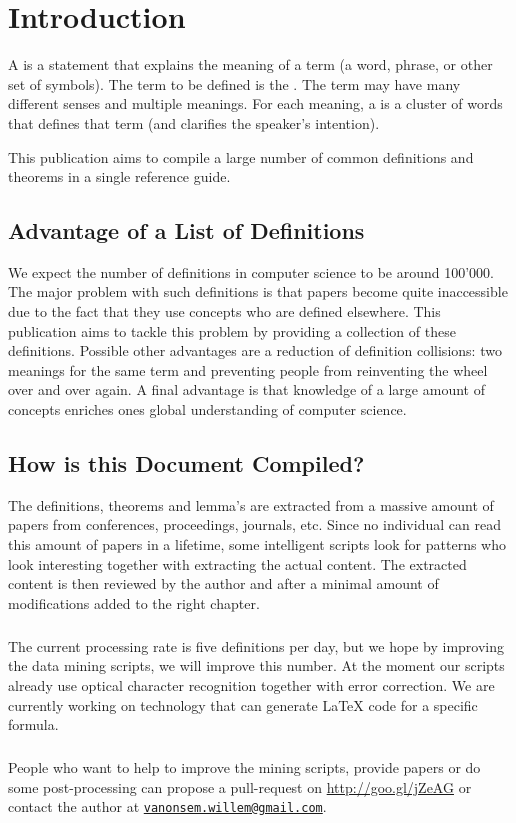 \chapter*{Introduction}

\begin{defi}
A  is a statement that explains the meaning of a term (a word, phrase, or other set of symbols). The term to be defined is the . The term may have many different senses and multiple meanings. For each meaning, a  is a cluster of words that defines that term (and clarifies the speaker's intention).
\cite{wiki:definition}
\end{defi}

This publication aims to compile a large number of common definitions and theorems in a single reference guide.

\section*{Advantage of a List of Definitions}

We expect the number of definitions in computer science to be around 100'000. The major problem with such definitions is that papers become quite inaccessible due to the fact that they use concepts who are defined elsewhere. This publication aims to tackle this problem by providing a collection of these definitions. Possible other advantages are a reduction of definition collisions: two meanings for the same term and preventing people from reinventing the wheel over and over again. A final advantage is that knowledge of a large amount of concepts enriches ones global understanding of computer science.

\section*{How is this Document Compiled?}

The definitions, theorems and lemma's are extracted from a massive amount of papers from conferences, proceedings, journals, etc. Since no individual can read this amount of papers in a lifetime, some intelligent scripts look for patterns who look interesting together with extracting the actual content. The extracted content is then reviewed by the author and after a minimal amount of modifications added to the right chapter.
\paragraph{}
The current processing rate is five definitions per day, but we hope by improving the data mining scripts, we will improve this number. At the moment our scripts already use optical character recognition together with error correction. We are currently working on technology that can generate \LaTeX{} code for a specific formula.
\paragraph{}
People who want to help to improve the mining scripts, provide papers or do some post-processing can propose a pull-request on \url{http://goo.gl/jZeAG} or contact the author at \href{mailto:vanonsem.willem@gmail.com}{\nolinkurl{vanonsem.willem@gmail.com}}.